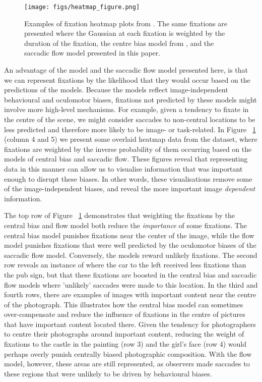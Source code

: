 \begin{figure}
\centering
\texttt{[image: figs/heatmap\_figure.png]}
\caption{Examples of fixation heatmap plots from \cite{clarke2013}. The same fixations are presented where the Gaussian at each fixation is weighted by the duration of the fixation, the centre bias model from \cite{clarke-tatler2014} , and the saccadic flow model presented in this paper.}
\label{fig:adjustedHeatmaps}
\end{figure}

An advantage of the \citet{clarke-tatler2014} model and the saccadic flow model presented here, is that we can represent fixations by the likelihood that they would occur based on the predictions of the models. Because the models reflect image-independent behavioural and oculomotor biases, fixations not predicted by these models might involve more high-level mechanisms. For example, given a tendency to fixate in the centre of the scene, we might consider saccades to non-central locations to be less predicted and therefore more likely to be image- or task-related.  In Figure ~\ref{fig:adjustedHeatmaps} (column 4 and 5) we present some overlaid heatmap data from the \citet{clarke2013} dataset, where fixations are weighted by the inverse probability of them occurring based on the models of central bias and saccadic flow. These figures reveal that representing data in this manner can allow us to visualise information that was important enough to disrupt these biases. In other words, these visualisations  remove some of the image-independent biases, and reveal the more important image \emph{dependent} information.


The top row of Figure ~\ref{fig:adjustedHeatmaps} demonstrates that weighting the fixations by the central bias and flow model both reduce the \emph{importance} of some fixations. The central bias model punishes fixations near the center of the image, while the flow model punishes fixations that were well predicted by the oculomotor biases of the saccadic flow model. Conversely, the models reward unlikely fixations. The second row reveals an instance of where the car to the left received less fixations than the pub sign, but that these fixations are boosted in the central bias and saccadic flow models where 'unlikely' saccades were made to this location. In the third and fourth rows, there are examples of images with important content near the centre of the photograph. This illustrates how the central bias model can sometimes over-compensate and reduce the influence of fixations in the centre of pictures that have important content located there. Given the tendency for photographers to centre their photographs around important content, reducing the weight of fixations to the castle in the painting (row 3) and the girl's face (row 4) would perhaps overly punish centrally biased photographic composition. With the flow model, however, these areas are still represented, as observers made saccades to these regions that were unlikely to be driven by behavioural biases.

